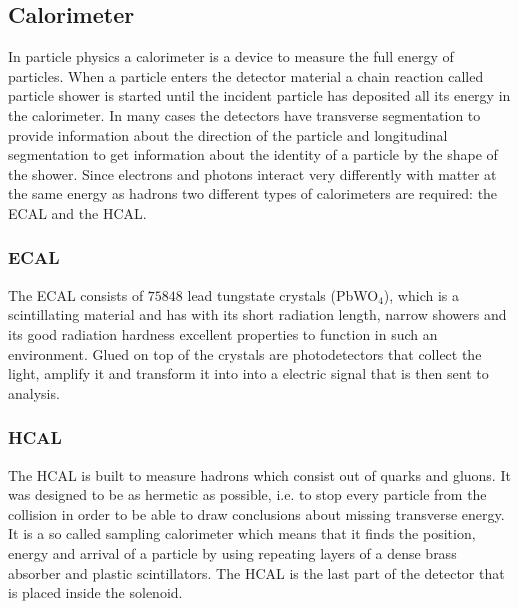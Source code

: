 \subsection{Calorimeter}
In particle physics a calorimeter is a device to measure the full energy of particles. When a particle enters the detector material a chain reaction called particle shower is started until the incident particle has deposited all its energy in the calorimeter. In many cases the detectors have transverse segmentation to provide information about the direction of the particle and longitudinal segmentation to get information about the identity of a particle by the shape of the shower. Since electrons and photons interact very differently with matter at the same energy as hadrons two different types of calorimeters are required: the \ac{ECAL} and the \ac{HCAL}.
\subsubsection{\ac{ECAL}}
The \ac{ECAL} consists of $75848$ lead tungstate crystals (PbWO$_{4}$), which is a scintillating material and has with its short radiation length, narrow showers and its good radiation hardness excellent properties to function in such an environment. Glued on top of the crystals are photodetectors that collect the light, amplify it and transform it into into a electric signal that is then sent to analysis.
\subsubsection{\ac{HCAL}}
The \ac{HCAL} is built to measure hadrons which consist out of quarks and gluons. It was designed to be as hermetic as possible, i.e. to stop every particle from the collision in order to be able to draw conclusions about missing transverse energy. It is a so called sampling calorimeter which means that it finds the position, energy and arrival of a particle by using repeating layers of a dense brass absorber and plastic scintillators. The \ac{HCAL} is the last part of the detector that is placed inside the solenoid.
